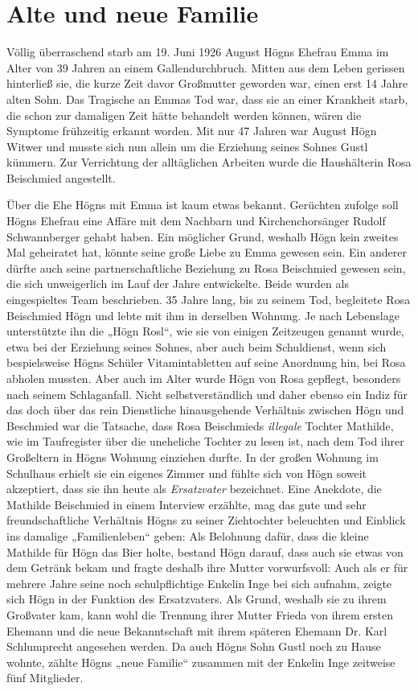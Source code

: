 \section{Alte und neue Familie}

Völlig überraschend starb am 19. Juni 1926 August Högns Ehefrau Emma im
Alter von 39 Jahren an einem Gallendurchbruch. Mitten aus dem Leben
gerissen hinterließ sie, die kurze Zeit davor Großmutter geworden
war, einen erst 14 Jahre alten Sohn. Das Tragische an Emmas Tod war,
dass sie an einer Krankheit starb, die schon zur damaligen Zeit hätte
behandelt werden können, wären die Symptome frühzeitig erkannt worden.
Mit nur 47 Jahren war August Högn Witwer und musste sich nun allein um
die Erziehung seines Sohnes Gustl kümmern. Zur Verrichtung der
alltäglichen Arbeiten wurde die Haushälterin Rosa Beischmied
angestellt.

Über die Ehe Högns mit Emma ist kaum etwas bekannt. Gerüchten zufolge
soll Högns Ehefrau eine Affäre mit dem Nachbarn und Kirchenchorsänger
Rudolf Schwannberger gehabt haben. Ein möglicher Grund, weshalb Högn
kein zweites Mal geheiratet hat, könnte seine große Liebe zu Emma
gewesen sein. Ein anderer dürfte auch seine partnerschaftliche
Beziehung zu Rosa Beischmied gewesen sein, die sich unweigerlich im
Lauf der Jahre entwickelte. Beide wurden als eingespieltes Team
beschrieben. 35 Jahre lang, bis zu seinem Tod, begleitete Rosa
Beischmied Högn und lebte mit ihm in derselben Wohnung. Je nach
Lebenslage unterstützte ihn die „Högn Rosl“, wie sie von einigen
Zeitzeugen genannt wurde, etwa bei der Erziehung seines Sohnes, aber
auch beim Schuldienst, wenn sich bespielsweise Högns Schüler
Vitamintabletten auf seine Anordnung hin, bei Rosa abholen mussten.
Aber auch im Alter wurde Högn von Rosa gepflegt, besonders nach seinem
Schlaganfall. Nicht selbstverständlich und daher ebenso ein Indiz für
das doch über das rein Dienstliche hinausgehende Verhältnis zwischen
Högn und Beschmied war die Tatsache, dass Rosa Beischmieds
\textit{illegale} Tochter Mathilde, wie im Taufregister über die
uneheliche Tochter zu lesen ist, nach dem Tod ihrer Großeltern in Högns
Wohnung einziehen durfte. In der großen Wohnung im Schulhaus erhielt
sie ein eigenes Zimmer und fühlte sich von Högn soweit akzeptiert, dass
sie ihn heute als \textit{Ersatzvater} bezeichnet. Eine Anekdote, die
Mathilde Beischmied in einem Interview erzählte, mag das gute und sehr
freundschaftliche Verhältnis Högns zu seiner Ziehtochter beleuchten und
Einblick ins damalige „Familienleben“ geben: Als Belohnung dafür, dass
die kleine Mathilde für Högn das Bier holte, bestand Högn darauf, dass
auch sie etwas von dem Getränk bekam und fragte deshalb ihre Mutter
vorwurfsvoll: Auch als er für mehrere Jahre seine noch schulpflichtige Enkelin
Inge bei sich aufnahm, zeigte sich Högn in der Funktion des
Ersatzvaters. Als Grund, weshalb sie zu ihrem Großvater kam, kann wohl
die Trennung ihrer Mutter Frieda von ihrem ersten Ehemann und die neue
Bekanntschaft mit ihrem späteren Ehemann Dr. Karl Schlumprecht
angesehen werden. Da auch Högns Sohn Gustl noch zu Hause wohnte, zählte
Högns „neue Familie“ zusammen mit der Enkelin Inge zeitweise fünf
Mitglieder.

